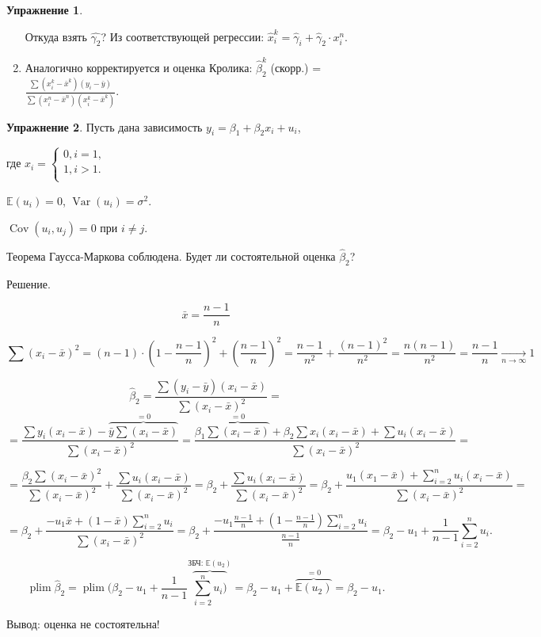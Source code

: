 \documentclass[12pt]{article} %
\theoremstyle{definition} %
\newtheorem{exercise}{Упражнение}[section]
\DeclareMathOperator{\Cov}{Cov}
\DeclareMathOperator{\Var}{Var}
\DeclareMathOperator{\plim}{plim}
\begin{document}
\begin{exercise}
\begin{enumerate}
    Откуда взять $\hat{\gamma_2}$? Из соответствующей регрессии: $\hat{x}_i^k = \hat{\gamma}_i + \hat{\gamma}_2 \cdot x_i^{n}$.

    \item Аналогично корректируется и оценка Кролика: $\displaystyle \hat{\beta}_{2}^k$ (скорр.) = $\displaystyle \frac{\sum (x_i^k - \bar{x}^k)(y_i - \bar{y})}{\sum (x_i^n - \bar{x}^n)(x_i^k - \bar{x}^k)}$.
\end{enumerate}

\end{exercise}

\begin{exercise}
Пусть дана зависимость $y_i = \beta_1 + \beta_2 x_i + u_i$,

где $x_i=\begin{cases}
               \displaystyle 0, i = 1, \\
               \displaystyle 1, i > 1. \\
            \end{cases}$


$\mathbb{E}(u_i) = 0$, $\Var(u_i) = \sigma^2$.

$\Cov(u_i, u_j) = 0$ при $i \neq j$.

Теорема Гаусса-Маркова соблюдена. Будет ли состоятельной оценка $\hat{\beta}_2$?

\theoremstyle{definition}{Решение.}

\[ \displaystyle \bar{x} = \frac{n - 1}{n} \]

\[ \displaystyle \sum (x_i - \bar{x})^2 = (n - 1) \cdot (1 - \frac{n - 1}{n})^2 + (\frac{n - 1}{n})^2 = \frac{n - 1}{n^2} + \frac{(n - 1)^2}{n^2} = \frac{n(n - 1)}{n^2} = \frac{n - 1}{n} \xrightarrow[n \to \infty]{} 1 \]

\[ \displaystyle \hat{\beta}_2 = \frac{\sum (y_i - \bar{y})(x_i - \bar{x})}{\sum (x_i - \bar{x})^2} = \]
\[ = \frac{\sum y_i (x_i - \bar{x}) - \overbrace{\bar{y}\sum(x_i - \bar{x})}^{=0}}{\sum (x_i - \bar{x})^2} = \frac{\beta_1 \overbrace{\sum (x_i - \bar{x})}^{=0} + \beta_2 \sum x_i (x_i - \bar{x}) + \sum u_i (x_i - \bar{x})}{\sum (x_i - \bar{x})^2} = \]

\[
= \displaystyle  \frac{\beta_2 \sum (x_i - \bar{x})^2}{\sum (x_i - \bar{x})^2} + \frac{\sum u_i (x_i - \bar{x})}{\sum (x_i - \bar{x})^2} = \beta_2 + \frac{\sum u_i (x_i - \bar{x})}{\sum (x_i - \bar{x})^2} =
\beta_2 + \frac{u_1(x_1 - \bar{x}) + \sum_{i=2}^n u_i(x_i - \bar{x})}{\sum (x_i - \bar{x})^2} = \]

\[
= \displaystyle \beta_2 + \frac{-u_1 \bar{x} + (1 - \bar{x})\sum_{i=2}^n u_i}{\sum (x_i - \bar{x})^2} = \beta_2 + \frac{-u_1 \frac{n - 1}{n} + (1 - \frac{n - 1}{n})\sum_{i=2}^n u_i }{\frac{n - 1}{n}} = \beta_2 - u_1 + \frac{1}{n - 1} \sum_{i=2}^n u_i
.\]

\[ \plim \hat{\beta}_2 = \plim (\beta_2 - u_1 + \frac{1}{n - 1} \overbrace{\sum_{i=2}^n u_i)}^\text{ЗБЧ: $\mathbb{E}(u_2)$} = \beta_2 - u_1 + \overbrace{\mathbb{E}(u_2)}^{=0} = \beta_2 - u_1
.\]

Вывод: оценка не состоятельна!
\end{exercise}
\end{document}
